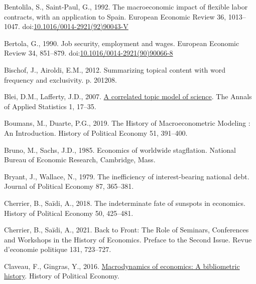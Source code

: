 \documentclass[]{elsarticle} %
\newlength{\cslhangindent}
\newlength{\cslentryspacingunit} %
\newenvironment{CSLReferences}[2] %
 {%
  \setlength{\parindent}{0pt}
  \ifodd #1
  \let\oldpar\par
  \def\par{\hangindent=\cslhangindent\oldpar}
  \fi
  \setlength{\parskip}{#2\cslentryspacingunit}
 }%
 {}
\begin{document}
\begin{CSLReferences}{1}{0}
\leavevmode{}%
Bentolila, S., Saint-Paul, G., 1992. The macroeconomic impact of
flexible labor contracts, with an application to {Spain}. European
Economic Review 36, 1013--1047.
doi:\href{https://doi.org/10.1016/0014-2921(92)90043-V}{10.1016/0014-2921(92)90043-V}

\leavevmode{}%
Bertola, G., 1990. Job security, employment and wages. European Economic
Review 34, 851--879.
doi:\href{https://doi.org/10.1016/0014-2921(90)90066-8}{10.1016/0014-2921(90)90066-8}

\leavevmode{}%
Bischof, J., Airoldi, E.M., 2012. Summarizing topical content with word
frequency and exclusivity. p. 201208.

\leavevmode{}%
Blei, D.M., Lafferty, J.D., 2007.
\href{https://www.jstor.org/stable/4537420}{A correlated topic model of
science}. The Annals of Applied Statistics 1, 17--35.

\leavevmode{}%
Boumans, M., Duarte, P.G., 2019. The {History} of {Macroeconometric
Modeling} : {An Introduction}. History of Political Economy 51,
391--400.

\leavevmode{}%
Bruno, M., Sachs, J.D., 1985. Economics of worldwide stagflation.
{National Bureau of Economic Research}, {Cambridge, Mass.}

\leavevmode{}%
Bryant, J., Wallace, N., 1979. The inefficiency of interest-bearing
national debt. Journal of Political Economy 87, 365--381.

\leavevmode{}%
Cherrier, B., Saïdi, A., 2018. The indeterminate fate of sunspots in
economics. History of Political Economy 50, 425--481.

\leavevmode{}%
Cherrier, B., Saïdi, A., 2021. Back to {Front}: {The Role} of
{Seminars}, {Conferences} and {Workshops} in the {History} of
{Economics}. {Preface} to the {Second Issue}. Revue d'economie politique
131, 723--727.

\leavevmode{}%
Claveau, F., Gingras, Y., 2016.
\href{http://hope.dukejournals.org/cgi/content/short/48/4/551?rss=1}{Macrodynamics
of economics: A bibliometric history}. History of Political Economy.


\end{CSLReferences}
\end{document}
